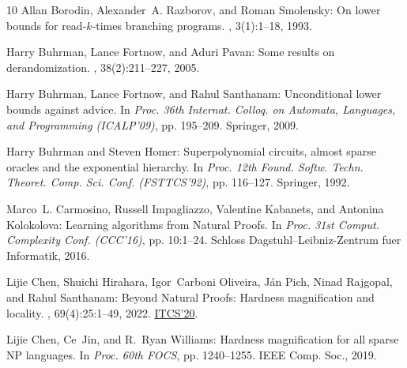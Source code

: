\documentclass[11pt]{article}
\numberwithin{equation}{section}
\theoremstyle{definition}
\theoremstyle{plain}
\begin{document}
\begin{thebibliography}{10}
{\sc Allan Borodin, Alexander~A. Razborov, and Roman Smolensky}: On lower
  bounds for read-$k$-times branching programs.
, 3(1):1--18, 1993.
\newblock [\epfmtdoi{10.1007/BF01200404}]

{\sc Harry Buhrman, Lance Fortnow, and Aduri Pavan}: Some results on
  derandomization.
, 38(2):211--227, 2005.
\newblock [\epfmtdoi{10.1007/s00224-004-1194-y}]

{\sc Harry Buhrman, Lance Fortnow, and Rahul Santhanam}: Unconditional lower
  bounds against advice.
\newblock In {\em Proc. 36th Internat. Colloq. on Automata, Languages, and
  Programming (ICALP'09)}, pp. 195--209. Springer, 2009.
\newblock [\epfmtdoi{10.1007/978-3-642-02927-1\_18}]

{\sc Harry Buhrman and Steven Homer}: Superpolynomial circuits, almost sparse
  oracles and the exponential hierarchy.
\newblock In {\em Proc. 12th Found. Softw. Techn. Theoret. Comp. Sci. Conf.
  (FSTTCS'92)}, pp. 116--127. Springer, 1992.
\newblock [\epfmtdoi{10.1007/3-540-56287-7\_99}]

{\sc Marco~L. Carmosino, Russell Impagliazzo, Valentine Kabanets, and Antonina
  Kolokolova}: Learning algorithms from {N}atural {P}roofs.
\newblock In {\em Proc. 31st Comput. Complexity Conf. (CCC'16)}, pp. 10:1--24.
  Schloss Dagstuhl--Leibniz-Zentrum fuer Informatik, 2016.

{\sc Lijie Chen, Shuichi Hirahara, Igor~Carboni Oliveira, J{\'{a}}n Pich, Ninad
  Rajgopal, and Rahul Santhanam}: Beyond {N}atural {P}roofs: {H}ardness
  magnification and locality.
, 69(4):25:1--49, 2022.
\newblock \prelim \href{https://doi.org/10.4230/LIPIcs.ITCS.2020.70}{ITCS'20}.
\newblock [\epfmtdoi{10.1145/3538391}]

{\sc Lijie Chen, Ce~Jin, and R.~Ryan Williams}: Hardness magnification for all
  sparse {NP} languages.
\newblock In {\em Proc. 60th FOCS}, pp. 1240--1255. IEEE Comp. Soc., 2019.


\end{thebibliography}
\end{document}
